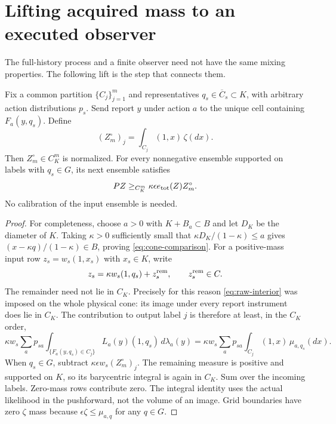 \section{Lifting acquired mass to an executed observer}\label{sec:calibration}
The full-history process and a finite observer need not have the same mixing properties. The following lift is the step that connects them.

\begin{lemma}\label{lem:lift}
Fix a common partition $\{C_j\}_{j=1}^m$ and representatives
$q_s\in\overline C_s\subset K$, with arbitrary action distributions $p_s$. Send report $y$ under action $a$ to the unique cell containing $F_a(y,q_s)$. Define
\[
 (Z_m^\circ)_j=\int_{C_j}(1,x)\,\zeta(dx).
\]
Then $Z_m^\circ\in C_K^m$ is normalized. For every nonnegative ensemble supported on labels with $q_s\in G$, its next ensemble satisfies
\begin{equation}\label{eq:local-lift}
 PZ\ge_{C_K^m}\kappa\epsilon e_{\rm tot}(Z)Z_m^\circ.
\end{equation}
No calibration of the input ensemble is needed.
\end{lemma}
\begin{proof}
For completeness, choose $a>0$ with $K+B_a\subset B$ and let $D_K$ be the diameter of $K$. Taking $\kappa>0$ sufficiently small that
$\kappa D_K/(1-\kappa)\le a$ gives
$(x-\kappa q)/(1-\kappa)\in B$, proving \eqref{eq:cone-comparison}.
For a positive-mass input row $z_s=w_s(1,x_s)$ with $x_s\in K$, write
\[
 z_s=\kappa w_s(1,q_s)+z_s^{\rm rem},\qquad z_s^{\rm rem}\in C.
\]
The remainder need not lie in $C_K$. Precisely for this reason \eqref{eq:raw-interior} was imposed on the whole physical cone: its image under every report instrument does lie in $C_K$. The contribution to output label $j$ is therefore at least, in the $C_K$ order,
\[
 \kappa w_s\sum_a p_{sa}
 \int_{\{F_a(y,q_s)\in C_j\}}L_a(y)(1,q_s)\,d\lambda_a(y)
 =\kappa w_s\sum_a p_{sa}\int_{C_j}(1,x)\,\mu_{a,q_s}(dx).
\]
When $q_s\in G$, subtract $\kappa\epsilon w_s(Z_m^\circ)_j$. The remaining measure is positive and supported on $K$, so its barycentric integral is again in $C_K$. Sum over the incoming labels. Zero-mass rows contribute zero. The integral identity uses the actual likelihood in the pushforward, not the volume of an image. Grid boundaries have zero $\zeta$ mass because $\epsilon\zeta\le\mu_{a,q}$ for any $q\in G$.
\end{proof}

